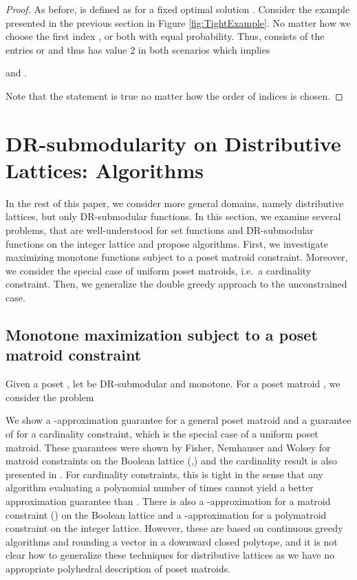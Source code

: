 \documentclass{article}
\theoremstyle{plain}
\theoremstyle{definition}
\begin{document}
\begin{proof}
As before,  is defined as  for a fixed optimal solution .  
Consider the example presented in the previous section in Figure \ref{fig:TightExample}. 
No matter how we choose the first index ,  or  both with equal probability. 
Thus,  consists of the entries  or  and thus has value 2 in both scenarios which implies 

 and    
.

Note that the statement is true no matter how the order of indices is chosen.
\end{proof}







\section{DR-submodularity on Distributive Lattices: Algorithms}\label{sec:SM-DR-DL-algos}
In the rest of this paper, we consider more general domains, namely distributive lattices, but only DR-submodular functions. 
In this section, we examine several problems, that are well-understood for set functions and DR-submodular functions on the integer lattice 
and propose algorithms.
First, we investigate maximizing monotone functions subject to a poset matroid constraint. 
Moreover, we consider the special case of uniform poset matroids, 
i.e.\ a cardinality constraint. Then, we generalize the double greedy approach to the unconstrained case.    

\subsection{Monotone maximization subject to a poset matroid constraint}

Given a poset ,  let  be DR-submodular and monotone.
For a poset matroid , we consider the problem
 
We show a -approximation guarantee for a general poset matroid and 
a guarantee of  for a cardinality constraint, which is the special case of a uniform poset matroid. 
These guarantees were shown by Fisher, Nemhauser and Wolsey for matroid constraints on the Boolean lattice (\cite{FisherGreedyI},\cite{FisherGreedyII}) and
 the cardinality result is also presented in \cite{KrauseSurvey}.  
For cardinality constraints, this is tight in the sense that any algorithm evaluating  
a polynomial number of times cannot yield a better approximation guarantee than  \cite{FisherGreedyI}. 
There is also a -approximation for a matroid constraint (\cite{MonotoneMatroid1}) on the Boolean lattice 
and a -approximation for a polymatroid constraint on the integer lattice.
However, these are based on continuous greedy algorithms and rounding a vector in a downward closed polytope, 
and it is not clear how to generalize these techniques for distributive lattices as we have no appropriate polyhedral description of poset matroids.  
\end{document}
